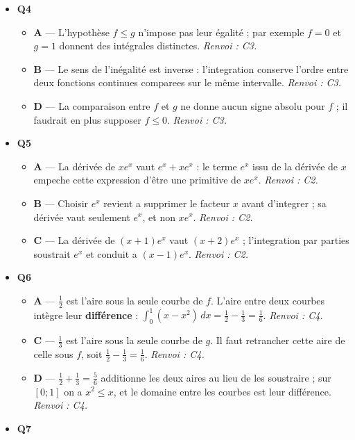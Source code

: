 \begin{itemize}
\begin{itemize}
  \end{itemize}
  \item \textbf{Q4}
  \begin{itemize}
    \item \textbf{A} — L'hypothèse $f\leqslant g$ n'impose pas leur égalité ; par exemple $f=0$ et $g=1$ donnent des intégrales distinctes. \emph{Renvoi : C3.}
    \item \textbf{B} — Le sens de l'inégalité est inverse : l'integration conserve l'ordre entre deux fonctions continues comparees sur le même intervalle. \emph{Renvoi : C3.}
    \item \textbf{D} — La comparaison entre $f$ et $g$ ne donne aucun signe absolu pour $f$ ; il faudrait en plus supposer $f\leqslant0$. \emph{Renvoi : C3.}
  \end{itemize}
  \item \textbf{Q5}
  \begin{itemize}
    \item \textbf{A} — La dérivée de $xe^x$ vaut $e^x+xe^x$ : le terme $e^x$ issu de la dérivée de $x$ empeche cette expression d'être une primitive de $xe^x$. \emph{Renvoi : C2.}
    \item \textbf{B} — Choisir $e^x$ revient a supprimer le facteur $x$ avant d'integrer ; sa dérivée vaut seulement $e^x$, et non $xe^x$. \emph{Renvoi : C2.}
    \item \textbf{C} — La dérivée de $(x+1)e^x$ vaut $(x+2)e^x$ ; l'integration par parties soustrait $e^x$ et conduit a $(x-1)e^x$. \emph{Renvoi : C2.}
  \end{itemize}
  \item \textbf{Q6}
  \begin{itemize}
    \item \textbf{A} — $\tfrac12$ est l'aire sous la seule courbe de $f$. L'aire entre deux courbes intègre leur \textbf{différence} : $\int_0^1(x-x^2)\,dx=\tfrac12-\tfrac13=\tfrac16$. \emph{Renvoi : C4.}
    \item \textbf{C} — $\tfrac13$ est l'aire sous la seule courbe de $g$. Il faut retrancher cette aire de celle sous $f$, soit $\tfrac12-\tfrac13=\tfrac16$. \emph{Renvoi : C4.}
    \item \textbf{D} — $\tfrac12+\tfrac13=\tfrac56$ additionne les deux aires au lieu de les soustraire ; sur $[0;1]$ on a $x^2\leq x$, et le domaine entre les courbes est leur différence. \emph{Renvoi : C4.}
  \end{itemize}
  \item \textbf{Q7}
  \begin{itemize}

\end{itemize}
\end{itemize}

